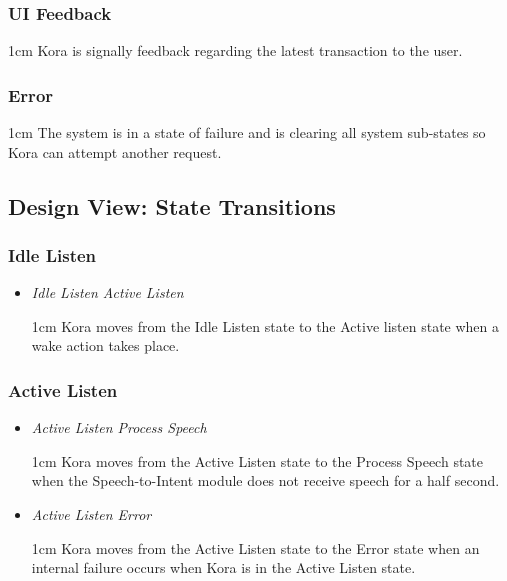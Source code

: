 \documentclass[onecolumn, draftclsnofoot,10pt, compsoc]{IEEEtran}
\def \botname{Kora\xspace}
\newenvironment{indentItem}[1][1cm]{\begin{adjustwidth}{#1}{}}{\end{adjustwidth}}
\begin{document}
	\subsubsection{UI Feedback}
		\begin{indentItem}
			\botname is signally feedback regarding the latest transaction to the user.
		\end{indentItem}
	
	\subsubsection{Error}
		\begin{indentItem}
			The system is in a state of failure and is clearing all system sub-states so \botname can attempt another request.
		\end{indentItem}
	
	
	\subsection{Design View: State Transitions}	
		\subsubsection{Idle Listen}
			\begin{itemize}
				\item \textit{Idle Listen \textrightarrow{}  Active Listen}
				\begin{indentItem}
					\botname moves from the Idle Listen state to the Active listen state when a wake action takes place.
				\end{indentItem}
			\end{itemize}
		
		\subsubsection{Active Listen}
		\begin{itemize}
			\item \textit{Active Listen \textrightarrow{}  Process Speech}
			\begin{indentItem}
				\botname moves from the Active Listen state to the Process Speech state when the Speech-to-Intent module does not receive speech for a half second.
			\end{indentItem}
			\item \textit{Active Listen \textrightarrow{}  Error}
			\begin{indentItem}
				\botname moves from the Active Listen state to the Error state when an internal failure occurs when \botname is in the Active Listen state.
			\end{indentItem}
		\end{itemize}
		
\end{document}
